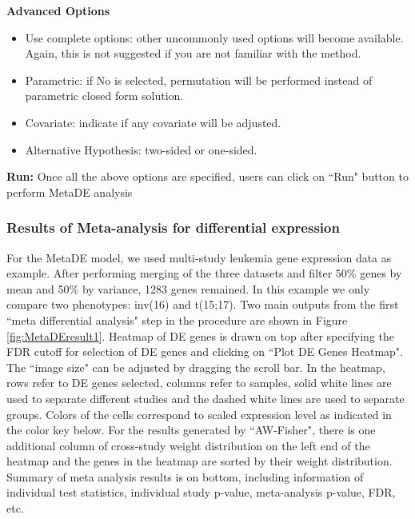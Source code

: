 \begin{steps}
\item \textbf{Advanced Options}
\begin{itemize}
\item Use complete options: other uncommonly used options will become available. Again, this is not suggested if you are not familiar with the method.
\item Parametric: if No is selected, permutation will be performed instead of parametric closed form solution.
\item Covariate: indicate if any covariate will be adjusted.
\item Alternative Hypothesis: two-sided or one-sided.
\end{itemize}

\item \textbf{Run:}
Once all the above options are specified, users can click on ``Run" button to perform MetaDE analysis

\end{steps}


\subsubsection{Results of Meta-analysis for differential expression}

For the MetaDE model, we used multi-study leukemia gene expression data as example.
After performing merging of the three datasets and filter 50\% genes by mean and 50\% by variance, 1283 genes remained.
In this example we only compare two phenotypes: inv(16) and t(15;17).
Two main outputs from the first ``meta differential analysis" step in the procedure are shown in Figure \ref{fig:MetaDEresult1}. 
Heatmap of DE genes is drawn on top after specifying the FDR cutoff for selection of DE genes and clicking on ``Plot DE Genes Heatmap". 
The ``image size" can be adjusted by dragging the scroll bar. 
In the heatmap, rows refer to DE genes selected, columns refer to samples, solid white lines are used to separate different studies and the dashed white lines are used to separate groups. 
Colors of the cells correspond to scaled expression level as indicated in the color key below. 
For the results generated by ``AW-Fisher", there is one additional column of cross-study weight distribution on the left end of the heatmap and the genes in the heatmap are sorted by their weight distribution.
Summary of meta analysis results is on bottom, 
including information of individual test statistics, individual study p-value, meta-analysis p-value, FDR, etc. 


